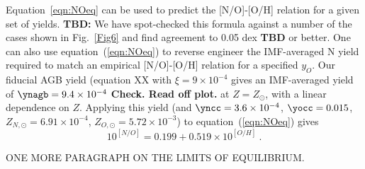 Equation~\ref{eqn:NOeq} can be used to predict the [N/O]-[O/H] relation
for a given set of yields.  {\bf TBD:} We have spot-checked this formula
against a number of the cases shown in Fig.~\ref{Fig6} and find agreement
to 0.05 dex {\bf TBD} or better.  One can also use equation~(\ref{eqn:NOeq})
to reverse engineer the IMF-averaged N yield required to match an
empirical [N/O]-[O/H] relation for a specified $y_O$.  Our fiducial
AGB yield (equation XX with $\xi = 9\times 10^{-4}$ gives an IMF-averaged
yield of $\ynagb = 9.4\times 10^{-4}$ {\bf Check.  Read off plot.}
at $Z = Z_\odot$, with a linear dependence on $Z$.
Applying this yield (and $\yncc = 3.6 \times 10^{-4}$, $\yocc = 0.015$,
$Z_{N,\odot}=6.91 \times 10^{-4}$, $Z_{O,\odot} = 5.72 \times 10^{-3}$)
to equation~(\ref{eqn:NOeq}) gives
\begin{equation}
10^{[N/O]} = 0.199 + 0.519 \times 10^{[O/H]}~.
\end{equation}

ONE MORE PARAGRAPH ON THE LIMITS OF EQUILIBRIUM.

